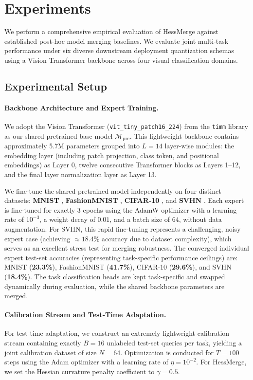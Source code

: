 \section{Experiments}
\label{sec:experiments}

We perform a comprehensive empirical evaluation of HessMerge against established post-hoc model merging baselines. We evaluate joint multi-task performance under six diverse downstream deployment quantization schemas using a Vision Transformer backbone across four visual classification domains.

\subsection{Experimental Setup}
\paragraph{Backbone Architecture and Expert Training.} 
We adopt the Vision Transformer (\texttt{vit\_tiny\_patch16\_224}) \cite{vit} from the \texttt{timm} library \cite{timm} as our shared pretrained base model $\mathcal{M}_{\text{pre}}$. This lightweight backbone contains approximately 5.7M parameters grouped into $L=14$ layer-wise modules: the embedding layer (including patch projection, class token, and positional embeddings) as Layer 0, twelve consecutive Transformer blocks as Layers 1--12, and the final layer normalization layer as Layer 13.

We fine-tune the shared pretrained model independently on four distinct datasets: \textbf{MNIST} \cite{mnist}, \textbf{FashionMNIST} \cite{fashionmnist}, \textbf{CIFAR-10} \cite{cifar10}, and \textbf{SVHN} \cite{svhn}. Each expert is fine-tuned for exactly 3 epochs using the AdamW optimizer with a learning rate of $10^{-3}$, a weight decay of $0.01$, and a batch size of $64$, without data augmentation. For SVHN, this rapid fine-tuning represents a challenging, noisy expert case (achieving $\approx 18.4\%$ accuracy due to dataset complexity), which serves as an excellent stress test for merging robustness. The converged individual expert test-set accuracies (representing task-specific performance ceilings) are: MNIST (\textbf{23.3\%}), FashionMNIST (\textbf{41.7\%}), CIFAR-10 (\textbf{29.6\%}), and SVHN (\textbf{18.4\%}). The task classification heads are kept task-specific and swapped dynamically during evaluation, while the shared backbone parameters are merged.

\paragraph{Calibration Stream and Test-Time Adaptation.}
For test-time adaptation, we construct an extremely lightweight calibration stream containing exactly $B=16$ unlabeled test-set queries per task, yielding a joint calibration dataset of size $N=64$. Optimization is conducted for $T=100$ steps using the Adam optimizer with a learning rate of $\eta = 10^{-2}$. For HessMerge, we set the Hessian curvature penalty coefficient to $\gamma = 0.5$.

